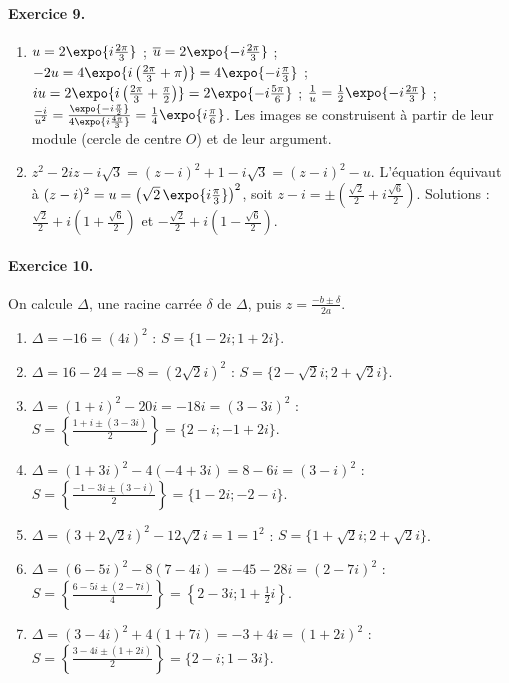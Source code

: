 \begin{corrige}
\paragraph{Exercice 9.}
\begin{enumerate}
\item $u = 2\expo{i\frac{2\pi}{3}}$ ; $\bar{u} = 2\expo{-i\frac{2\pi}{3}}$ ; $-2u = 4\expo{i\left(\frac{2\pi}{3}+\pi\right)} = 4\expo{-i\frac{\pi}{3}}$ ;
      $iu = 2\expo{i\left(\frac{2\pi}{3}+\frac{\pi}{2}\right)} = 2\expo{-i\frac{5\pi}{6}}$ ; $\frac{1}{u} = \frac{1}{2}\expo{-i\frac{2\pi}{3}}$ ;
      $\frac{-i}{u^2} = \frac{\expo{-i\frac{\pi}{2}}}{4\expo{i\frac{4\pi}{3}}} = \frac{1}{4}\expo{i\frac{\pi}{6}}$.
      Les images se construisent \`a partir de leur module (cercle de centre $O$) et de leur argument.
\item $z^2 - 2iz - i\sqrt{3} = (z - i)^2 + 1 - i\sqrt{3} = (z - i)^2 - u$. L'\'equation \'equivaut \`a $(z - i)^2 = u = \left(\sqrt{2}\,\expo{i\frac{\pi}{3}}\right)^2$,
      soit $z - i = \pm\left(\frac{\sqrt{2}}{2} + i\frac{\sqrt{6}}{2}\right)$.
      Solutions : $\boxed{\frac{\sqrt{2}}{2} + i\left(1 + \frac{\sqrt{6}}{2}\right)}$ et $\boxed{-\frac{\sqrt{2}}{2} + i\left(1 - \frac{\sqrt{6}}{2}\right)}$.
\end{enumerate}

\paragraph{Exercice 10.}
On calcule $\Delta$, une racine carr\'ee $\delta$ de $\Delta$, puis $z = \frac{-b \pm \delta}{2a}$.
\begin{enumerate}
\item $\Delta = -16 = (4i)^2$ : $S = \{1 - 2i ; 1 + 2i\}$.
\item $\Delta = 16 - 24 = -8 = (2\sqrt{2}i)^2$ : $S = \{2 - \sqrt{2}i ; 2 + \sqrt{2}i\}$.
\item $\Delta = (1+i)^2 - 20i = -18i = (3 - 3i)^2$ : $S = \left\{\frac{1 + i \pm (3 - 3i)}{2}\right\} = \{2 - i ; -1 + 2i\}$.
\item $\Delta = (1+3i)^2 - 4(-4+3i) = 8 - 6i = (3 - i)^2$ : $S = \left\{\frac{-1 - 3i \pm (3 - i)}{2}\right\} = \{1 - 2i ; -2 - i\}$.
\item $\Delta = (3 + 2\sqrt{2}i)^2 - 12\sqrt{2}i = 1 = 1^2$ : $S = \{1 + \sqrt{2}i ; 2 + \sqrt{2}i\}$.
\item $\Delta = (6 - 5i)^2 - 8(7 - 4i) = -45 - 28i = (2 - 7i)^2$ : $S = \left\{\frac{6 - 5i \pm (2 - 7i)}{4}\right\} = \left\{2 - 3i ; 1 + \frac{1}{2}i\right\}$.
\item $\Delta = (3 - 4i)^2 + 4(1 + 7i) = -3 + 4i = (1 + 2i)^2$ : $S = \left\{\frac{3 - 4i \pm (1 + 2i)}{2}\right\} = \{2 - i ; 1 - 3i\}$.
\end{enumerate}


\end{corrige}
